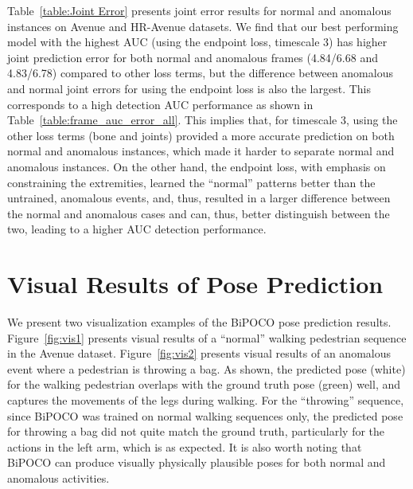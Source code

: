 \documentclass[nohyperref]{article}
\theoremstyle{plain}
\theoremstyle{definition}
\theoremstyle{remark}
\begin{document}
Table~\ref{table:Joint Error} presents joint error results for normal and anomalous instances on Avenue and HR-Avenue datasets. We find that our best performing model with the highest AUC (using the endpoint loss, timescale 3) has higher joint prediction error for both normal and anomalous frames (4.84/6.68 and 4.83/6.78) compared to other loss terms, but the difference between anomalous and normal joint errors for using the endpoint loss is also the largest. This corresponds to a high detection AUC performance as shown in Table~\ref{table:frame_auc_error_all}. This implies that, for timescale 3, using the other loss terms (bone and joints) provided a more accurate prediction on both normal and anomalous instances, which made it harder to separate normal and anomalous instances. On the other hand, the endpoint loss, with emphasis on constraining the extremities, learned the ``normal'' patterns better than the untrained, anomalous events, and, thus, resulted in a larger difference between the normal and anomalous cases and can, thus, better distinguish between the two, leading to a higher AUC detection performance. 





\section{Visual Results of Pose Prediction}

We present two visualization examples of the BiPOCO pose prediction results. Figure~\ref{fig:vis1} presents visual results of a ``normal'' walking pedestrian sequence in the Avenue dataset. Figure~\ref{fig:vis2} presents visual results of an anomalous event where a pedestrian is throwing a bag. As shown, the predicted pose (white) for the walking pedestrian overlaps with the ground truth pose (green) well, and captures the movements of the legs during walking. For the ``throwing'' sequence, since BiPOCO was trained on normal walking sequences only, the predicted pose for throwing a bag did not quite match the ground truth, particularly for the actions in the left arm, which is as expected. It is also worth noting that BiPOCO can produce visually physically plausible poses for both normal and anomalous activities.
\end{document}
